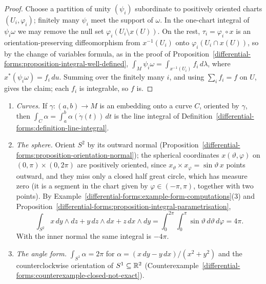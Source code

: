 \begin{proof}
Choose a partition of unity $(\psi_i)$ subordinate to positively oriented charts $(U_i, \varphi_i)$; finitely many $\psi_i$ meet the support of $\omega$. In the one-chart integral of $\psi_i\omega$ we may
remove the null set $\varphi_i(U_i \setminus x(U))$. On the rest, $\tau_i = \varphi_i \circ x$ is an orientation-preserving diffeomorphism from $x^{-1}(U_i)$ onto $\varphi_i(U_i \cap x(U))$, so by the
change of variables formula, as in the proof of Proposition~\ref{differential-forms:proposition-integral-well-defined}, $\int_M\psi_i\omega = \int_{x^{-1}(U_i)}f_i\,d\lambda$, where
$x^*(\psi_i\omega) = f_i\,du$. Summing over the finitely many $i$, and using $\sum_if_i = f$ on $U$, gives the claim; each $f_i$ is integrable, so $f$ is.
\end{proof}

\begin{example}\label{differential-forms:example-integrals}
\begin{enumerate}
\item \emph{Curves.} If $\gamma \colon (a, b) \to M$ is an embedding onto a curve $C$, oriented by $\gamma$, then $\int_C\alpha = \int_a^b\alpha(\dot\gamma(t))\,dt$ is the line integral of
Definition~\ref{differential-forms:definition-line-integral}.
\item \emph{The sphere.} Orient $S^2$ by its outward normal (Proposition~\ref{differential-forms:proposition-orientation-normal}); the spherical coordinates
$x(\vartheta, \varphi)$ on $(0, \pi) \times (0, 2\pi)$ are positively oriented, since $x_\vartheta \times x_\varphi = \sin\vartheta\,x$ points outward, and they miss only a closed half great
circle, which has measure zero (it is a segment in the chart given by $\varphi \in (-\pi, \pi)$, together with two points). By
Example~\ref{differential-forms:example-form-computations}(3) and Proposition~\ref{differential-forms:proposition-integral-parametrisation},
\[
\int_{S^2}x\,dy \wedge dz + y\,dz \wedge dx + z\,dx \wedge dy = \int_0^{2\pi}\int_0^\pi\sin\vartheta\,d\vartheta\,d\varphi = 4\pi .
\]
With the inner normal the same integral is $-4\pi$.
\item \emph{The angle form.} $\int_{S^1}\alpha = 2\pi$ for $\alpha = (x\,dy - y\,dx)/(x^2 + y^2)$ and the counterclockwise orientation of $S^1 \subseteq \mathbb{R}^2$
(Counterexample~\ref{differential-forms:counterexample-closed-not-exact}).
\end{enumerate}
\end{example}

